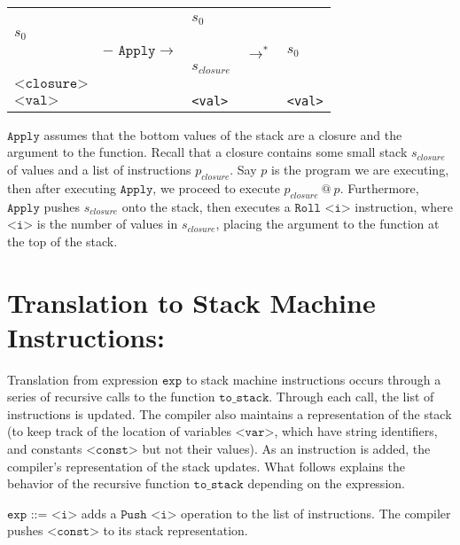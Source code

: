 \documentclass[11pt]{article}
\begin{document}
\begin{center}
  \begin{tabular}{|P{2.5cm}|P{2.5cm}|P{2.5cm}|P{1cm}|P{2.5cm}|}
      
    &&&&\\ 
    &&$s_0$&&\\
    $s_0$&&&&\\ 
    & $- \texttt{  Apply} \rightarrow$ &&  $\rightarrow^*$ & $s_0$\\ 
    &&$s_{closure}$&&\\ 
    $\texttt{<closure>}$&&&&\\ 
    $\texttt{<val>}$&&\texttt{<val>}&& \texttt{<val>} \\
      
  \end{tabular}
\end{center}

$\texttt{Apply}$ assumes that the bottom values of the stack are a closure and the argument to the function. Recall that a closure contains some small stack $s_{closure}$ of values and a list of instructions $p_{closure}$. Say $p$ is the program we are executing, then after executing $\texttt{Apply}$, we proceed to execute $p_{closure}\ @\ p$. Furthermore, $\texttt{Apply}$ pushes $s_{closure}$ onto the stack, then executes a $\texttt{Roll <i>}$ instruction, where $\texttt{<i>}$ is the number of values in $s_{closure}$, placing the argument to the function at the top of the stack.


\section*{Translation to Stack Machine Instructions:}

Translation from expression $\texttt{exp}$ to stack machine instructions occurs through a series of recursive calls to the function $\texttt{to\_stack}$. Through each call, the list of instructions is updated. The compiler also maintains a representation of the stack (to keep track of the location of variables $\texttt{<var>}$, which have string identifiers, and constants $\texttt{<const>}$ but not their values). As an instruction is added, the compiler's representation of the stack updates. What follows explains the behavior of the recursive function $\texttt{to\_stack}$ depending on the expression.

\vspace{5mm}

$\texttt{exp ::= <i>}$ adds a $\texttt{Push <i>}$ operation to the list of instructions. The compiler pushes $\texttt{<const>}$ to its stack representation.
\end{document}

